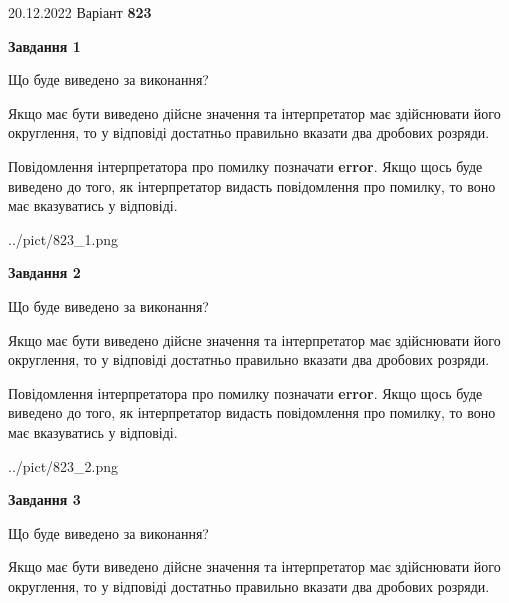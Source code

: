 \documentclass[12pt, ukrainian]{article}
\begin{document}
{20.12.2022 Варіант \No \textbf { 823 }\par}
{
\begin {Large}

{\begin {center}\textbf{Завдання 1}\end {center}}\par
Що буде виведено за виконання? \par

Якщо має бути виведено дійсне значення та інтерпретатор має здійснювати його округлення, 
то у відповіді достатньо правильно вказати два дробових розряди.

Повідомлення інтерпретатора про помилку позначати \textbf{error}.
Якщо щось буде виведено до того, як інтерпретатор видасть повідомлення про помилку, 
то воно має вказуватись у відповіді. \par

\begin{center}
	{../pict/823_1.png}
\end{center}
\newpage

{\begin {center}\textbf{Завдання 2}\end {center}}\par
Що буде виведено за виконання? \par

Якщо має бути виведено дійсне значення та інтерпретатор має здійснювати його округлення, 
то у відповіді достатньо правильно вказати два дробових розряди.

Повідомлення інтерпретатора про помилку позначати \textbf{error}.
Якщо щось буде виведено до того, як інтерпретатор видасть повідомлення про помилку, 
то воно має вказуватись у відповіді. \par

\begin{center}
	{../pict/823_2.png}
\end{center}
\newpage

{\begin {center}\textbf{Завдання 3}\end {center}}\par
Що буде виведено за виконання? \par

Якщо має бути виведено дійсне значення та інтерпретатор має здійснювати його округлення, 
то у відповіді достатньо правильно вказати два дробових розряди.


\end{Large}}
\end{document}
